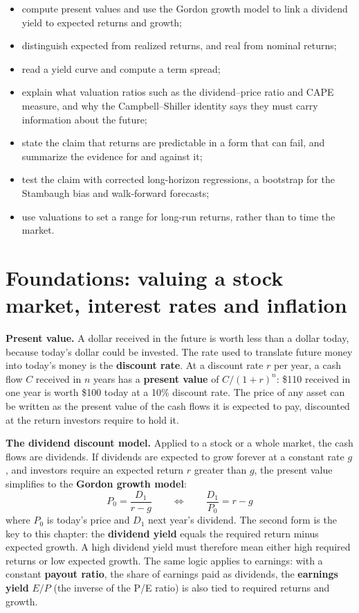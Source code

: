 \begin{itemize}
  \item compute present values and use the Gordon growth model to link a dividend yield to expected returns and growth;
  \item distinguish expected from realized returns, and real from nominal returns;
  \item read a yield curve and compute a term spread;
  \item explain what valuation ratios such as the dividend--price ratio and CAPE measure, and why the Campbell--Shiller identity says they must carry information about the future;
  \item state the claim that returns are predictable in a form that can fail, and summarize the evidence for and against it;
  \item test the claim with corrected long-horizon regressions, a bootstrap for the Stambaugh bias and walk-forward forecasts;
  \item use valuations to set a range for long-run returns, rather than to time the market.
\end{itemize}

\section{Foundations: valuing a stock market, interest rates and inflation}
\label{sec:07-foundations}

\textbf{Present value.} A dollar received in the future is worth less than a dollar today, because today's dollar could be invested. The rate used to translate future money into today's money is the \textbf{discount rate}. At a discount rate $r$ per year, a cash flow $C$ received in $n$ years has a \textbf{present value} of $C/(1 + r)^n$: \$110 received in one year is worth \$100 today at a 10\% discount rate. The price of any asset can be written as the present value of the cash flows it is expected to pay, discounted at the return investors require to hold it.

\textbf{The dividend discount model.} Applied to a stock or a whole market, the cash flows are dividends. If dividends are expected to grow forever at a constant rate $g$, and investors require an expected return $r$ greater than $g$, the present value simplifies to the \textbf{Gordon growth model}:
\begin{equation}
  P_0 = \frac{D_1}{r - g} \qquad \Longleftrightarrow \qquad \frac{D_1}{P_0} = r - g
  \label{eq:07-gordon}
\end{equation}
where $P_0$ is today's price and $D_1$ next year's dividend. The second form is the key to this chapter: the \textbf{dividend yield} equals the required return minus expected growth. A high dividend yield must therefore mean either high required returns or low expected growth. The same logic applies to earnings: with a constant \textbf{payout ratio}, the share of earnings paid as dividends, the \textbf{earnings yield} $E/P$ (the inverse of the P/E ratio) is also tied to required returns and growth.

